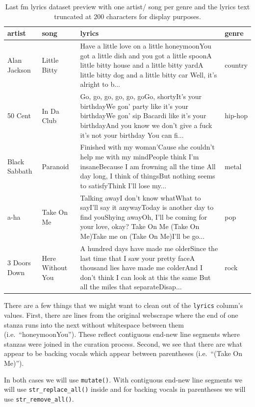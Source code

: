 \documentclass[
  letterpaper,
]{scrbook}
\begin{document}
\hypertarget{tbl-td-lastfm-read-preview}{}
\begin{table}
\caption{\label{tbl-td-lastfm-read-preview}Last fm lyrics dataset preview with one artist/ song per genre and the
lyrics text truncated at 200 characters for display purposes. }\tabularnewline

\centering
\begin{tabular}{llll}
\toprule
artist & song & lyrics & genre\\
\midrule
Alan Jackson & Little Bitty & Have a little love on a little honeymoonYou got a little dish and you got a little spoonA little bitty house and a little bitty yardA little bitty dog and a little bitty car Well, it's alright to b... & country\\
50 Cent & In Da Club & Go, go, go, go, go, goGo, shortyIt's your birthdayWe gon' party like it's your birthdayWe gon' sip Bacardi like it's your birthdayAnd you know we don't give a fuck it's not your birthday You can fi... & hip-hop\\
Black Sabbath & Paranoid & Finished with my woman'Cause she couldn't help me with my mindPeople think I'm insaneBecause I am frowning all the time All day long, I think of thingsBut nothing seems to satisfyThink I'll lose my... & metal\\
a-ha & Take On Me & Talking awayI don't know whatWhat to sayI'll say it anywayToday is another day to find youShying awayOh, I'll be coming for your love, okay? Take On Me (Take On Me)Take me on (Take On Me)I'll be go... & pop\\
3 Doors Down & Here Without You & A hundred days have made me olderSince the last time that I saw your pretty faceA thousand lies have made me colderAnd I don't think I can look at this the same But all the miles that separateDisap... & rock\\
\bottomrule
\end{tabular}
\end{table}

There are a few things that we might want to clean out of the
\texttt{lyrics} column's values. First, there are lines from the
original webscrape where the end of one stanza runs into the next
without whitespace between them (i.e.~``honeymoonYou''). These reflect
contiguous end-new line segments where stanzas were joined in the
curation process. Second, we see that there are what appear to be
backing vocals which appear between parentheses (i.e.~``(Take On Me)'').

In both cases we will use \texttt{mutate()}. With contiguous end-new
line segments we will use \texttt{str\_replace\_all()} inside and for
backing vocals in parentheses we will use \texttt{str\_remove\_all()}.
\end{document}
